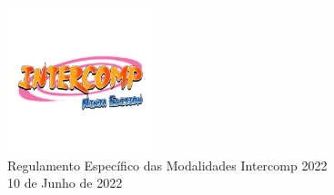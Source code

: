 \begin{center}

	\vspace*{\fill}
	{\let\clearpage\relax \includegraphics[width=120pt]{../logo-ninja-edition.jpg} \\ [.5cm]}
	\Huge{Regulamento Específico das Modalidades Intercomp 2022} \\ [.5cm]
	\normalsize{10 de Junho de 2022}
	\vspace*{\fill}

\end{center}
